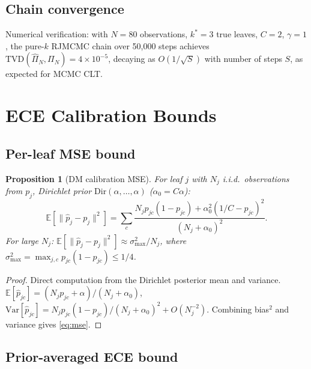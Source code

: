 \documentclass[ba,preprint]{imsart}
\theoremstyle{plain}
\newtheorem{proposition}[theorem]{Proposition}
\theoremstyle{remark}
\newcommand{\Eop}{\mathbb{E}}
\begin{document}
\subsection{Chain convergence}

Numerical verification: with $N=80$ observations, $k^*=3$ true leaves, $C=2$,
$\gamma=1$, the pure-$k$ RJMCMC chain over 50,000 steps achieves
$\text{TVD}(\hat{\Pi}_N, \Pi_N) = 4 \times 10^{-5}$,
decaying as $O(1/\sqrt{S})$ with number of steps $S$, as expected for MCMC CLT.

\section{ECE Calibration Bounds}
\label{sec:ece}

\subsection{Per-leaf MSE bound}

\begin{proposition}[DM calibration MSE]
\label{prop:mse}
  For leaf $j$ with $N_j$ i.i.d.\ observations from $p_j$,
  Dirichlet prior $\mathrm{Dir}(\alpha,\ldots,\alpha)$ ($\alpha_0=C\alpha$):
  \begin{equation}
    \Eop\!\left[\|\hat{p}_j - p_j\|^2\right]
    = \sum_c \frac{N_j p_{jc}(1-p_{jc}) + \alpha_0^2(1/C - p_{jc})^2}
                  {(N_j+\alpha_0)^2}.
    \label{eq:mse}
  \end{equation}
  For large $N_j$: $\Eop[\|\hat{p}_j - p_j\|^2] \approx \sigma^2_{\max}/N_j$,
  where $\sigma^2_{\max} = \max_{j,c} p_{jc}(1-p_{jc}) \leq 1/4$.
\end{proposition}

\begin{proof}
Direct computation from the Dirichlet posterior mean and variance.
$\Eop[\hat{p}_{jc}] = (N_j p_{jc} + \alpha)/(N_j+\alpha_0)$,
$\mathrm{Var}[\hat{p}_{jc}] = N_j p_{jc}(1-p_{jc})/(N_j+\alpha_0)^2 + O(N_j^{-2})$.
Combining bias$^2$ and variance gives \eqref{eq:mse}.
\end{proof}

\subsection{Prior-averaged ECE bound}
\end{document}
